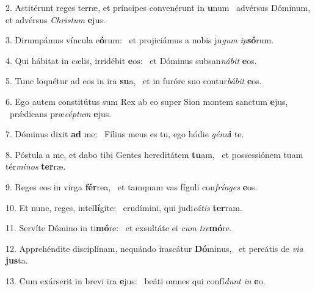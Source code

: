 2. Astitérunt reges terræ, et príncipes convenérunt in \textbf{u}num \ast\  advérsus Dóminum, et advérsus \textit{Chris}\textit{tum} \textbf{e}jus.\

3. Dirumpámus víncula e\textbf{ó}rum: \ast\  et projiciámus a nobis ju\textit{gum} \textit{ip}\textbf{só}rum.\

4. Qui hábitat in cælis, irridébit \textbf{e}os: \ast\  et Dóminus subsan\textit{ná}\textit{bit} \textbf{e}os.\

5. Tunc loquétur ad eos in ira \textbf{su}a, \ast\  et in furóre suo contur\textit{bá}\textit{bit} \textbf{e}os.\

6. Ego autem constitútus sum Rex ab eo super Sion montem sanctum \textbf{e}jus, \ast\  prǽdicans præ\textit{cép}\textit{tum} \textbf{e}jus.\

7. Dóminus dixit \textbf{ad} me: \ast\  Fílius meus es tu, ego hódie \textit{gé}\textit{nu}\textbf{i} te.\

8. Póstula a me, et dabo tibi Gentes hereditátem \textbf{tu}am, \ast\  et possessiónem tuam tér\textit{mi}\textit{nos} \textbf{ter}ræ.\

9. Reges eos in virga \textbf{fér}rea, \ast\  et tamquam vas fíguli con\textit{frín}\textit{ges} \textbf{e}os.\

10. Et nunc, reges, intel\textbf{lí}gite: \ast\  erudímini, qui judi\textit{cá}\textit{tis} \textbf{ter}ram.\

11. Servíte Dómino in ti\textbf{mó}re: \ast\  et exsultáte ei \textit{cum} \textit{tre}\textbf{mó}re.\

12. Apprehéndite disciplínam, nequándo irascátur \textbf{Dó}minus, \ast\  et pereátis de \textit{vi}\textit{a} \textbf{jus}ta.\

13. Cum exárserit in brevi ira \textbf{e}jus: \ast\  beáti omnes qui confí\textit{dunt} \textit{in} \textbf{e}o.\


